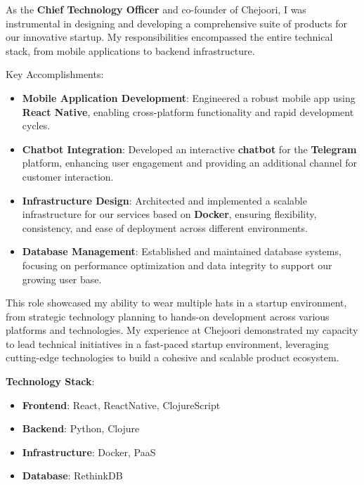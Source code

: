 As the \textbf{Chief Technology Officer} and co-founder of Chejoori, I was instrumental in designing and developing a comprehensive suite of products for our innovative startup. My responsibilities encompassed the entire technical stack, from mobile applications to backend infrastructure.

Key Accomplishments:
\begin{itemize}
    \item \textbf{Mobile Application Development}: Engineered a robust mobile app using \textbf{React Native}, enabling cross-platform functionality and rapid development cycles.
    
    \item \textbf{Chatbot Integration}: Developed an interactive \textbf{chatbot} for the \textbf{Telegram} platform, enhancing user engagement and providing an additional channel for customer interaction.
    
    \item \textbf{Infrastructure Design}: Architected and implemented a scalable infrastructure for our services based on \textbf{Docker}, ensuring flexibility, consistency, and ease of deployment across different environments.
    
    \item \textbf{Database Management}: Established and maintained database systems, focusing on performance optimization and data integrity to support our growing user base.
\end{itemize}

This role showcased my ability to wear multiple hats in a startup environment, from strategic technology planning to hands-on development across various platforms and technologies. My experience at Chejoori demonstrated my capacity to lead technical initiatives in a fast-paced startup environment, leveraging cutting-edge technologies to build a cohesive and scalable product ecosystem.

\smallskip
\textbf{Technology Stack}:
\begin{itemize}
    \item \textbf{Frontend}: React, ReactNative, ClojureScript
    \item \textbf{Backend}: Python, Clojure
    \item \textbf{Infrastructure}: Docker, PaaS
    \item \textbf{Database}: RethinkDB
\end{itemize}

